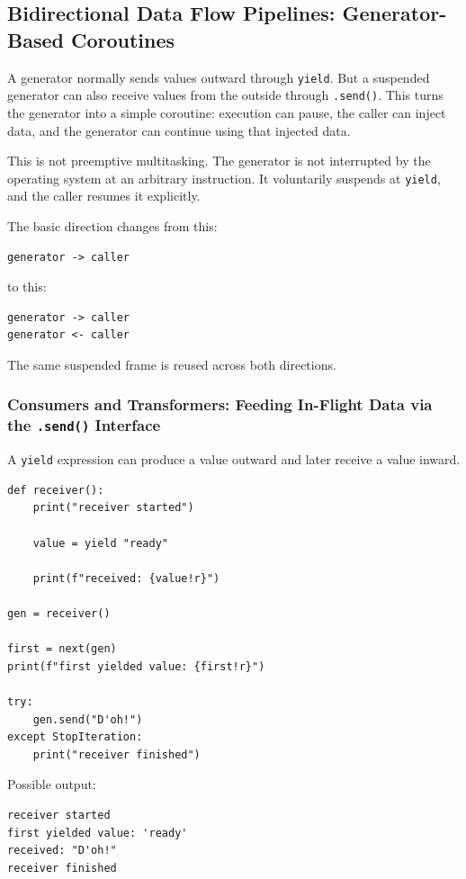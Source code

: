 \subsection{Bidirectional Data Flow Pipelines: Generator-Based Coroutines}

A generator normally sends values outward through \texttt{yield}. But a suspended generator can also receive values from the outside through \texttt{.send()}. This turns the generator into a simple coroutine: execution can pause, the caller can inject data, and the generator can continue using that injected data.

This is not preemptive multitasking. The generator is not interrupted by the operating system at an arbitrary instruction. It voluntarily suspends at \texttt{yield}, and the caller resumes it explicitly.

The basic direction changes from this:

\begin{verbatim}
generator -> caller
\end{verbatim}

to this:

\begin{verbatim}
generator -> caller
generator <- caller
\end{verbatim}

The same suspended frame is reused across both directions.

\subsubsection{Consumers and Transformers: Feeding In-Flight Data via the \texttt{.send()} Interface}

A \texttt{yield} expression can produce a value outward and later receive a value inward.

\begin{verbatim}
def receiver():
    print("receiver started")

    value = yield "ready"

    print(f"received: {value!r}")

gen = receiver()

first = next(gen)
print(f"first yielded value: {first!r}")

try:
    gen.send("D'oh!")
except StopIteration:
    print("receiver finished")
\end{verbatim}

Possible output:

\begin{verbatim}
receiver started
first yielded value: 'ready'
received: "D'oh!"
receiver finished
\end{verbatim}

